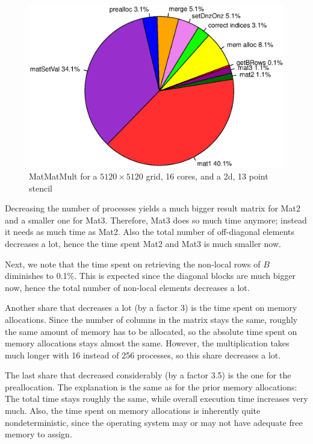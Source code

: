 \begin{figure}[tbp]
	\centering
	\includegraphics[width=1\textwidth, trim={0 3.5cm 0 3cm},clip]{16cores_5120}
	\caption{MatMatMult for a $5120 \times 5120$ grid, 16 cores, and a 2d, 13 point stencil} 
	\label{fig:pie_16_5120}
\end{figure}

Decreasing the number of processes yields a much bigger result matrix for Mat2 and a smaller one for Mat3. Therefore, Mat3 does so much time anymore; instead it needs as much time as Mat2. Also the total number of off-diagonal elements decreases a lot, hence the time spent Mat2 and Mat3 is much smaller now.

Next, we note that the time spent on retrieving the non-local rows of $B$ diminishes to 0.1\%. This is expected since the diagonal blocks are much bigger now, hence the total number of non-local elements decreases a lot. 

Another share that decreases a lot (by a factor 3) is the time spent on memory allocations. Since the number of columns in the matrix stays the same, roughly the same amount of memory has to be allocated, so the absolute time spent on memory allocations stays almost the same. However, the multiplication takes much longer with 16 instead of 256 processes, so this share decreases a lot. 

The last share that decreased considerably (by a factor 3.5) is the one for the preallocation. The explanation is the same as for the prior memory allocations: The total time stays roughly the same, while overall execution time increases very much. Also, the time spent on memory allocations is inherently quite nondeterministic, since the operating system may or may not have adequate free memory to assign.

